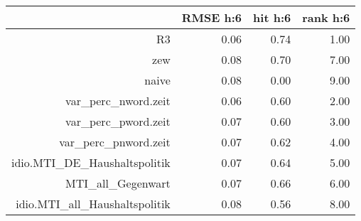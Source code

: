 \begin{table}[ht]
\centering
\begin{tabular}{rrrr}
  \hline
 & RMSE h:6 & hit h:6 & rank h:6 \\ 
  \hline
R3 & 0.06 & 0.74 & 1.00 \\ 
  zew & 0.08 & 0.70 & 7.00 \\ 
  naive & 0.08 & 0.00 & 9.00 \\ 
  var\_perc\_nword.zeit & 0.06 & 0.60 & 2.00 \\ 
  var\_perc\_pword.zeit & 0.07 & 0.60 & 3.00 \\ 
  var\_perc\_pnword.zeit & 0.07 & 0.62 & 4.00 \\ 
  idio.MTI\_DE\_Haushaltspolitik & 0.07 & 0.64 & 5.00 \\ 
  MTI\_all\_Gegenwart & 0.07 & 0.66 & 6.00 \\ 
  idio.MTI\_all\_Haushaltspolitik & 0.08 & 0.56 & 8.00 \\ 
   \hline
\end{tabular}
\end{table}
